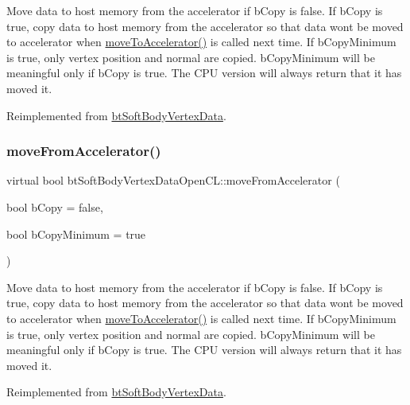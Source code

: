 Move data to host memory from the accelerator if b\+Copy is false. If b\+Copy is true, copy data to host memory from the accelerator so that data won\textquotesingle{}t be moved to accelerator when \hyperlink{classbtSoftBodyVertexDataOpenCL_abd4012054faecf26669f00a04bfd6170}{move\+To\+Accelerator()} is called next time. If b\+Copy\+Minimum is true, only vertex position and normal are copied. b\+Copy\+Minimum will be meaningful only if b\+Copy is true. The C\+PU version will always return that it has moved it. 

Reimplemented from \hyperlink{classbtSoftBodyVertexData_aaa8ab4065ecf47a9c3b946b67b6c9f1b}{bt\+Soft\+Body\+Vertex\+Data}.

\mbox{\label{classbtSoftBodyVertexDataOpenCL_a89dc6f649bbf848d0af34697fbf1d67b}} 
\subsubsection{\texorpdfstring{move\+From\+Accelerator()}{moveFromAccelerator()}\hspace{0.1cm}{\footnotesize\ttfamily [2/2]}}
{\footnotesize\ttfamily virtual bool bt\+Soft\+Body\+Vertex\+Data\+Open\+C\+L\+::move\+From\+Accelerator (\begin{DoxyParamCaption}\item[{bool}]{b\+Copy = {\ttfamily false},  }\item[{bool}]{b\+Copy\+Minimum = {\ttfamily true} }\end{DoxyParamCaption})\hspace{0.3cm}{\ttfamily [virtual]}}

Move data to host memory from the accelerator if b\+Copy is false. If b\+Copy is true, copy data to host memory from the accelerator so that data won\textquotesingle{}t be moved to accelerator when \hyperlink{classbtSoftBodyVertexDataOpenCL_abd4012054faecf26669f00a04bfd6170}{move\+To\+Accelerator()} is called next time. If b\+Copy\+Minimum is true, only vertex position and normal are copied. b\+Copy\+Minimum will be meaningful only if b\+Copy is true. The C\+PU version will always return that it has moved it. 

Reimplemented from \hyperlink{classbtSoftBodyVertexData_aaa8ab4065ecf47a9c3b946b67b6c9f1b}{bt\+Soft\+Body\+Vertex\+Data}.

